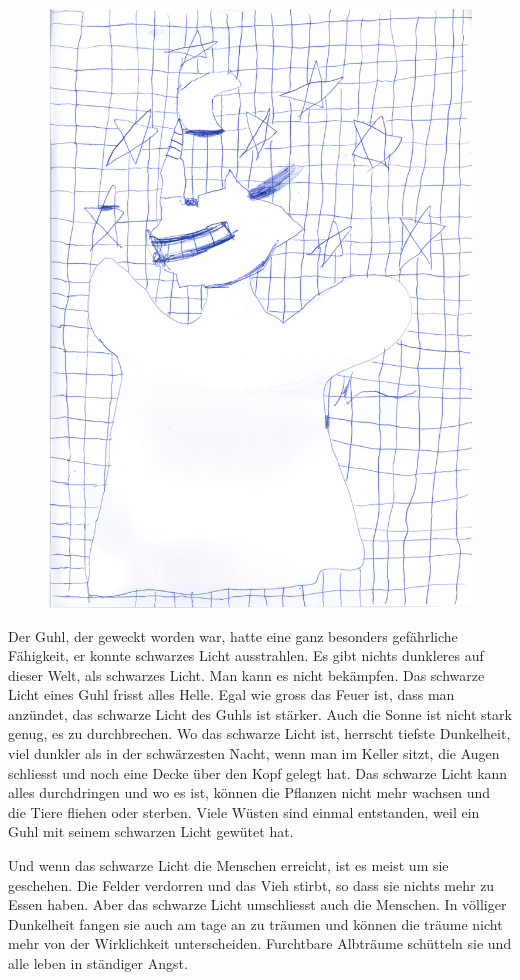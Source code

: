 \begin{figure}[hb]
\centering
\includegraphics[width=.7\textwidth]{bilder/dark2.pdf}
\end{figure}

Der Guhl, der geweckt worden war, hatte eine ganz besonders gefährliche Fähigkeit, er konnte schwarzes Licht ausstrahlen. Es gibt nichts dunkleres auf dieser Welt, als schwarzes Licht. Man kann es nicht bekämpfen. Das schwarze Licht eines Guhl frisst alles Helle. Egal wie gross das Feuer ist, dass man anzündet, das schwarze Licht des Guhls ist stärker. Auch die Sonne ist nicht stark genug, es zu durchbrechen. Wo das schwarze Licht ist, herrscht tiefste Dunkelheit, viel dunkler als in der schwärzesten Nacht, wenn man im Keller sitzt, die Augen schliesst und noch eine Decke über den Kopf gelegt hat. Das schwarze Licht kann alles durchdringen und wo es ist, können die Pflanzen nicht mehr wachsen und die Tiere fliehen oder sterben. Viele Wüsten sind einmal entstanden, weil ein Guhl mit seinem schwarzen Licht gewütet hat. 

Und wenn das schwarze Licht die Menschen erreicht, ist es meist um sie geschehen. Die Felder verdorren und das Vieh stirbt, so dass sie nichts mehr zu Essen haben. Aber das schwarze Licht umschliesst auch die Menschen. In völliger Dunkelheit fangen sie auch am tage an zu träumen und können die träume nicht mehr von der Wirklichkeit unterscheiden. Furchtbare Albträume schütteln sie und alle leben in ständiger Angst.


